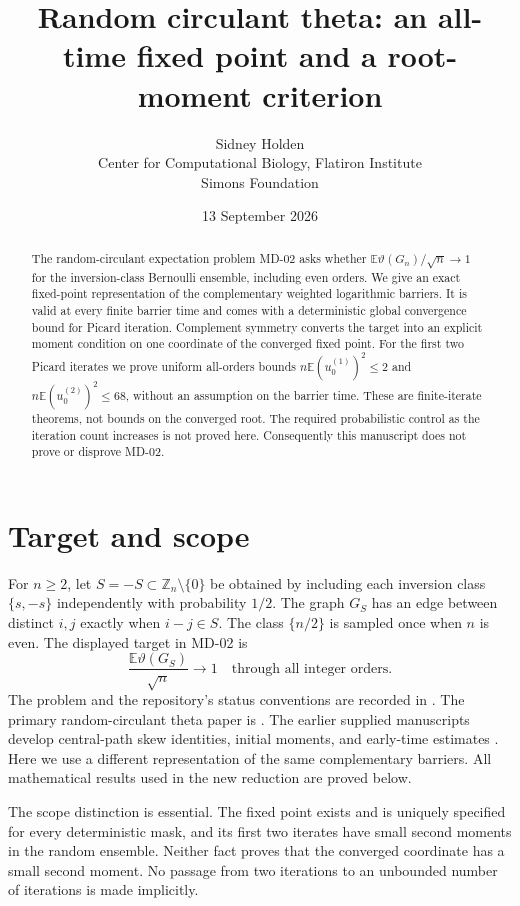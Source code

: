 \documentclass[11pt]{article}
\title{Random circulant theta: an all-time fixed point and a root-moment criterion}
\author{Sidney Holden\\{\small Center for Computational Biology, Flatiron Institute}\\{\small Simons Foundation}}\date{13 September 2026}
\theoremstyle{remark}\newtheorem{remark}[theorem]{Remark}
\newcommand{\E}{\mathbb E}
\newcommand{\tht}{\vartheta}
\begin{document}
\maketitle
\begin{abstract}
The random-circulant expectation problem MD-02 asks whether
$\E\tht(G_n)/\sqrt n\to1$ for the inversion-class Bernoulli ensemble, including
even orders. We give an exact fixed-point representation of the complementary
weighted logarithmic barriers. It is valid at every finite barrier time and
comes with a deterministic global convergence bound for Picard iteration.
Complement symmetry converts the target into an explicit moment condition on
one coordinate of the converged fixed point. For the first two Picard iterates
we prove uniform all-orders bounds $n\E(u^{(1)}_0)^2\le2$ and
$n\E(u^{(2)}_0)^2\le68$, without an assumption on the barrier time. These are
finite-iterate theorems, not bounds on the converged root. The required
probabilistic control as the iteration count increases is not proved here.
Consequently this manuscript does not prove or disprove MD-02.
\end{abstract}
\tableofcontents
\newpage

\section{Target and scope}
For $n\ge2$, let $S=-S\subset\mathbb Z_n\setminus\{0\}$ be obtained by
including each inversion class $\{s,-s\}$ independently with probability
$1/2$. The graph $G_S$ has an edge between distinct $i,j$ exactly when
$i-j\in S$. The class $\{n/2\}$ is sampled once when $n$ is even.
The displayed target in MD-02 is
\begin{equation}\label{eq:target}
 \frac{\E\tht(G_S)}{\sqrt n}\longrightarrow1
 \quad\text{through all integer orders.}
\end{equation}
The problem and the repository's status conventions are recorded in
\cite{repo,contributing}. The primary random-circulant theta paper is
\cite{paper}. The earlier supplied manuscripts develop central-path skew
identities, initial moments, and early-time estimates \cite{prior1,prior2}.
Here we use a different representation of the same complementary barriers.
All mathematical results used in the new reduction are proved below.

The scope distinction is essential. The fixed point exists and is uniquely
specified for every deterministic mask, and its first two iterates have
small second moments in the random ensemble. Neither fact proves that the
converged coordinate has a small second moment. No passage from two
iterations to an unbounded number of iterations is made implicitly.
\end{document}
